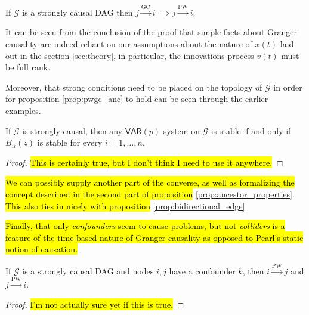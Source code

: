 \documentclass[12pt]{article}
\def\gc{\overset{\text{GC}}{\rightarrow}}  %
\def\pwgc{\overset{\text{PW}}{\rightarrow}}  %
\def\gcg{\mathcal{G}}  %
\def\VAR{\mathsf{VAR}}  %
\begin{document}
\begin{corollary}
  \label{cor:gc_implies_pwgc}
  If $\gcg$ is a strongly causal DAG then $j \gc i \implies j \pwgc i$.
\end{corollary}

\begin{remark}
  It can be seen from the conclusion of the proof that simple facts
  about Granger causality are indeed reliant on our assumptions about
  the nature of $x(t)$ laid out in the section \ref{sec:theory}, in
  particular, the innovations process $v(t)$ must be full rank.
  
  Moreover, that strong conditions need to be placed on the topology
  of $\gcg$ in order for proposition \ref{prop:pwgc_anc} to hold can
  be seen through the earlier examples.
\end{remark}

\begin{lemma}
  If $\gcg$ is strongly causal, then any $\VAR(p)$ system on $\gcg$ is stable if and only if
  $B_{ii}(z)$ is stable for every $i = 1, \ldots, n$.
\end{lemma}
\begin{proof}
  \hl{This is certainly true, but I don't think I need to use it anywhere.}
\end{proof}

\hl{We can possibly supply another part of the converse, as well as
  formalizing the concept described in the second part of proposition} \ref{prop:ancestor_properties}.  \hl{This also ties in nicely with proposition} \ref{prop:bidirectional_edge}

\hl{Finally, that only \textit{confounders} seem to cause problems,
  but not \textit{colliders} is a feature of the time-based nature of
  Granger-causality as opposed to Pearl's static notion of causation.}

\begin{proposition}
  If $\gcg$ is a strongly causal DAG and nodes $i, j$ have a confounder $k$, then
  $i \pwgc j$ and $j \pwgc i$.
\end{proposition}

\begin{proof}
  \hl{I'm not actually sure yet if this is true.}
\end{proof}  

\end{document}
